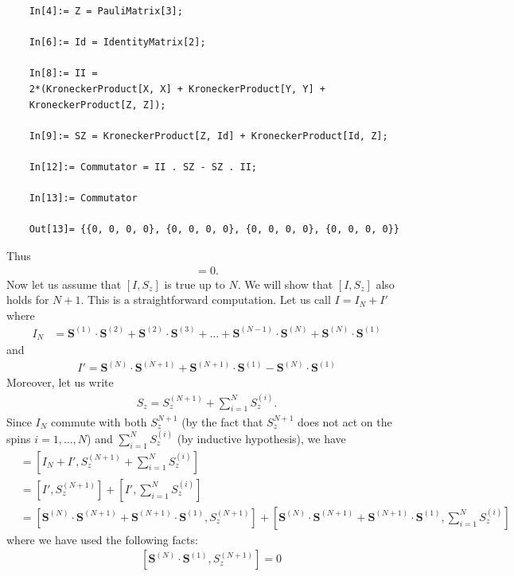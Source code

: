 \documentclass{article}
\theoremstyle{definition}
\newcommand{\lb}{\left[}
\newcommand{\rb}{\right]}
\begin{document}
\begin{enumerate}[label=(\alph*)]
\begin{lstlisting}
	In[4]:= Z = PauliMatrix[3];
	
	In[6]:= Id = IdentityMatrix[2];
	
	In[8]:= II = 
	2*(KroneckerProduct[X, X] + KroneckerProduct[Y, Y] + 
	KroneckerProduct[Z, Z]);
	
	In[9]:= SZ = KroneckerProduct[Z, Id] + KroneckerProduct[Id, Z];
	
	In[12]:= Commutator = II . SZ - SZ . II;
	
	In[13]:= Commutator
	
	Out[13]= {{0, 0, 0, 0}, {0, 0, 0, 0}, {0, 0, 0, 0}, {0, 0, 0, 0}}
	\end{lstlisting}
	Thus 
	\begin{align*}
	[I^{(2)}, Sz]  = 0.
	\end{align*}
	Now let us assume that $[I, S_z]$ is true up to $N$. We will show that $[I,S_z]$ also holds for $N+1$. This is a straightforward computation. Let us call $I = I_N + I'$ where 
	\begin{align*}
	I_N 
	&= \mathbf{S}^{(1)}\cdot \mathbf{S}^{(2)}+ \mathbf{S}^{(2)}\cdot \mathbf{S}^{(3)} + \dots + \mathbf{S}^{(N-1)}\cdot \mathbf{S}^{(N)}+ \mathbf{S}^{(N)}\cdot \mathbf{S}^{(1)} 
	\end{align*}
	and 
	\begin{align*}
	I' = \mathbf{S}^{(N)}\cdot \mathbf{S}^{(N+1)} + \mathbf{S}^{(N+1)}\cdot \mathbf{S}^{(1)}  -\mathbf{S}^{(N)}\cdot \mathbf{S}^{(1)} 
	\end{align*}
	Moreover, let us write 
	\begin{align*}
	S_z = S_z^{(N+1)} +\sum_{i=1}^N S_z^{(i)}.
	\end{align*}
	Since $I_N$ commute with both $S_z^{N+1}$ (by the fact that $S_z^{N+1}$ does not act on the spins $i=1,\dots,N$) and $\sum_{i=1}^N S_z^{(i)}$ (by inductive hypothesis), we have
	\begin{align*}
	[I,S_z]
	&= \lb I_N + I' , S_z^{(N+1)} +\sum_{i=1}^N S_z^{(i)} \rb \\
	&= \lb I' , S_z^{(N+1)}\rb  +\lb I', \sum_{i=1}^N S_z^{(i)} \rb \\
	&= \lb \mathbf{S}^{(N)}\cdot \mathbf{S}^{(N+1)} + \mathbf{S}^{(N+1)}\cdot \mathbf{S}^{(1)} , S_z^{(N+1)} \rb + \lb \mathbf{S}^{(N)}\cdot \mathbf{S}^{(N+1)} + \mathbf{S}^{(N+1)}\cdot \mathbf{S}^{(1)}  , \sum_{i=1}^N S_z^{(i)}\rb 
	\end{align*}
	where we have used the following facts: 
	\begin{align*}
	&\lb  \mathbf{S}^{(N)}\cdot \mathbf{S}^{(1)} , S_z^{(N+1)} \rb = 0\\

\end{align*}
\end{enumerate}
\end{document}
